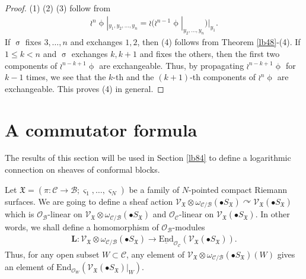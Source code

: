 \documentclass[12pt,b5paper,notitlepage]{report}
\theoremstyle{definition}
\theoremstyle{plain}
\newcommand{\fk}{\mathfrak}
\newcommand{\mc}{\mathcal}
\newcommand{\End}{\mathrm{End}} %
\newcommand{\scr}{\mathscr}
\newcommand{\sgm}{\varsigma}
\newcommand{\mbf}{\mathbf}
\newcommand{\blt}{\bullet}
\numberwithin{equation}{section}
\begin{document}
\begin{proof}
(1) (2) (3) follow from
\begin{align}
\wr^n\upphi|_{y_1,y_2,\dots,y_n}=\wr(\wr^{n-1}\upphi|_{y_2,\dots,y_n})|_{y_1}.
\end{align}
If $\upsigma$ fixes $3,\dots,n$ and exchanges $1,2$, then (4) follows from Theorem \ref{lb48}-(4). If $1\leq k<n$ and $\upsigma$ exchanges $k,k+1$ and fixes the others, then the first two components of $\wr^{n-k+1}\upphi$ are exchangeable. Thus, by propagating $\wr^{n-k+1}\upphi$ for $k-1$ times, we see that the $k$-th and the $(k+1)$-th components of $\wr^n\upphi$ are exchangeable. This proves (4) in general.
\end{proof}





\section{A commutator formula}

The results of this section will be used in Section \ref{lb84} to define a logarithmic connection on sheaves of conformal blocks.

Let $\fk X=(\pi:\mc C\rightarrow\mc B;\sgm_1,\dots,\sgm_N)$ be a family of $N$-pointed compact Riemann surfaces. We are going to define a sheaf action $\scr V_{\fk X}\otimes\omega_{\mc C/\mc B}(\blt S_{\fk X})\curvearrowright \scr V_{\fk X}(\blt S_{\fk X})$ which is $\scr O_{\mc B}$-linear on $\scr V_{\fk X}\otimes\omega_{\mc C/\mc B}(\blt S_{\fk X})$ and $\scr O_{\mc C}$-linear on $\scr V_{\fk X}(\blt S_{\fk X})$. In other words, we shall define a homomorphism of $\scr O_{\mc B}$-modules
\begin{align*}
\mbf L:\scr V_{\fk X}\otimes\omega_{\mc C/\mc B}(\blt S_{\fk X})\rightarrow\underline{\End}_{\scr O_{\mc C}}(\scr V_{\fk X}(\blt S_{\fk X})).
\end{align*}
Thus, for any open subset $W\subset\mc C$, any element of $\scr V_{\fk X}\otimes\omega_{\mc C/\mc B}(\blt S_{\fk X})(W)$ gives an element of $\End_{\scr O_W}(\scr V_{\fk X}(\blt S_{\fk X})|_W)$. 
\end{document}
